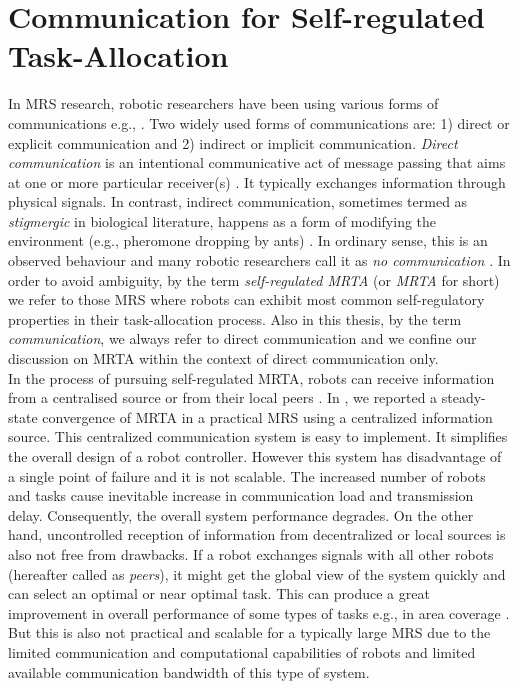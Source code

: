 \section{Communication for Self-regulated Task-Allocation}
In MRS research, robotic researchers have been using various forms of communications e.g., \cite{Bonabeau+1999,Labella2007}. Two widely used forms of communications are: 1) direct or explicit communication and 2) indirect or implicit communication. {\em Direct communication} is an intentional communicative act of message passing that aims at one or more particular receiver(s) \cite{Mataric1998}. It typically exchanges information through physical signals. In contrast, indirect communication, sometimes termed as {\em stigmergic} in biological literature, happens as a form of modifying the environment (e.g., pheromone dropping by ants) \cite{Bonabeau+1999}. In ordinary sense, this is an observed behaviour and many robotic researchers call it as {\em no communication} \cite{Labella2007}. In order to avoid ambiguity, by the term {\em self-regulated MRTA} (or {\em MRTA} for short) we refer to those MRS where robots can exhibit most common self-regulatory properties \cite{Bonabeau+1999} in their task-allocation process. Also in this thesis, by the term {\em communication}, we always refer to direct communication and we confine our discussion on MRTA within the context of direct communication only.\\
%
In the process of pursuing self-regulated MRTA, robots can receive information from a centralised source \cite{Krieger+2000} or from their local peers \cite{Agassounon+2004}. In \cite{Sarker+2010robotic}, we reported a steady-state convergence of MRTA in a practical MRS using a centralized information source. This centralized communication system is easy to implement. It simplifies the overall design of a robot controller. However this system has disadvantage of a single point of failure and it is not scalable. The increased number of robots and tasks cause inevitable increase in communication load and transmission delay. Consequently, the overall system performance degrades. On the other hand, uncontrolled reception of information from decentralized or local sources is also not free from drawbacks. If a robot exchanges signals with all other robots (hereafter called as {\em peers}), it might get the global view of the system quickly and can select an optimal or near optimal task. This can produce a great improvement in overall performance of some types of tasks e.g., in area coverage \cite{Rutishauser+2009}. But this is also not practical and scalable for a typically large MRS due to the limited communication and computational capabilities of robots and limited available communication bandwidth of this type of system.\\
